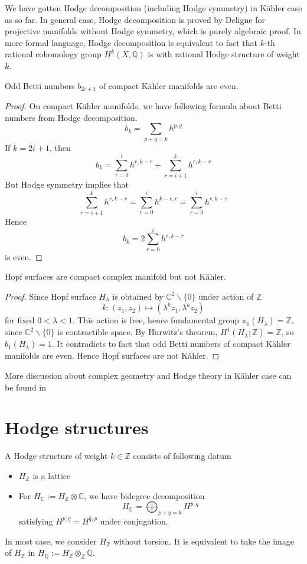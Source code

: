 \documentclass[11pt,oneside,a4paper]{amsart}
\begin{document}
We have gotten Hodge decomposition (including Hodge symmetry) in K\"ahler case as so far. In general case, Hodge decomposition is proved by Deligne for projective manifolds without Hodge symmetry, which is purely algebraic proof. In more formal language, Hodge decomposition is equivalent to fact that $k$-th rational cohomology group $H^k(X, \mathbb{Q})$ is with rational Hodge structure of weight $k$.
\begin{secprop}
	Odd Betti numbers $b_{2i+1}$ of compact K\"ahler manifolds are even.
\end{secprop}
\begin{proof}
	On compact K\"ahler manifolds, we have following formula about Betti numbers from Hodge decomposition.
	\begin{equation}
		b_{k}= \sum_{p+q=k}h^{p,q}
	\end{equation}
	If $k=2i+1$, then 
	\[
	b_{k}= \sum_{r=0}^{i}h^{r,k-r} + \sum_{r=i+1}^{k}h^{r,k-r}
	\]
	But Hodge symmetry implies that 
	\[
	\sum_{r=i+1}^{k}h^{r,k-r}= \sum_{r=0}^{i}h^{k-r,r} =\sum_{r=0}^{i}h^{r,k-r}
	\]
	Hence 
	\[
	b_k= 2\sum_{r=0}^{i}h^{r,k-r}
	\]
	is even.
\end{proof}

\begin{seccor}
	Hopf surfaces are compact complex manifold but not K\"ahler.
\end{seccor}
\begin{proof}
	Since Hopf surface $H_\lambda$ is obtained by $\mathbb{C}^2 \backslash\{0\}$ under action of $\mathbb{Z}$
	\[
	k : (z_1, z_2) \mapsto (\lambda^k z_1, \lambda^k z_2)
	\]
	for fixed $0 < \lambda <1$.
	This action is free, hence fundamental group $\pi_1(H_\lambda)= \mathbb{Z}$, since $\mathbb{C}^2\backslash\{0\}$ is contractible space. By Hurwitz's theorem, $H^1(H_\lambda;\mathbb{Z})= \mathbb{Z}$, so $b_1(H_\lambda)=1$. It contradicts to fact that odd Betti numbers of compact K\"ahler manifolds are even. Hence Hopf surfaces are not K\"ahler. 
\end{proof}

\begin{rem}
	More discussion about complex geometry and Hodge theory in K\"ahler case can be found in \cite{Huybrechts2004,Griffiths1994}
\end{rem}
\section{Hodge structures}
\begin{secdefn}
A Hodge structure of weight $k \in \mathbb{Z}$ consists of following datum
\begin{itemize}
\item $H_{\mathbb{Z}}$ is a lattice
\item For $H_{\mathbb{C}}:= H_{\mathbb{Z}} \otimes \mathbb{C}$, we have bidegree decomposition
\[
H_{\mathbb{C}}= \bigoplus_{p+q=k} H^{p,q}
\]
satisfying $H^{p,q}= \overline{H^{q,p}}$ under conjugation.
\end{itemize}
\end{secdefn}
In most case, we consider $H_{\mathbb{Z}}$ without torsion. It is equivalent to take the image of $H_{\mathbb{Z}}$ in $H_{\mathbb{Q}}:= H_{\mathbb{Z}}\otimes_{\mathbb{Z}} \mathbb{Q}$.
\end{document}
